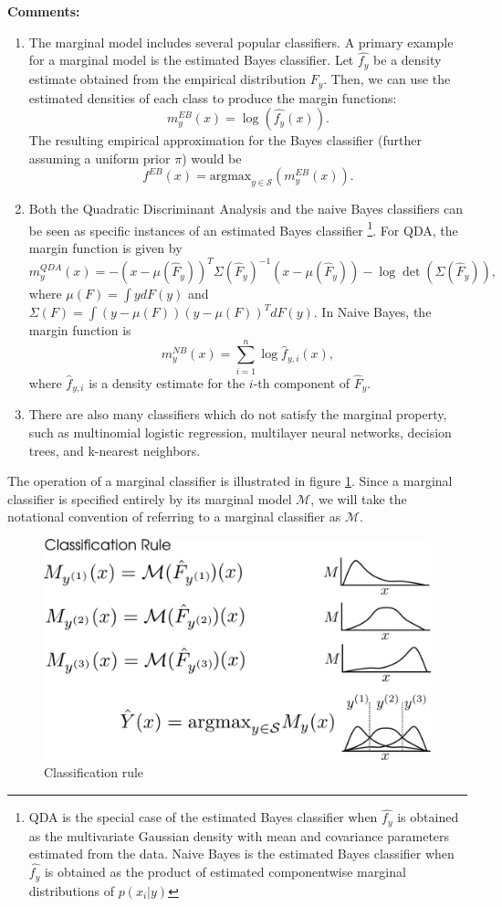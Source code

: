 \textbf{Comments:}
\begin{enumerate}
\item The marginal model includes several popular classifiers.
A primary example for a marginal model is the estimated Bayes
classifier. Let $\hat{f_y}$ be a density estimate obtained from the
empirical distribution $\hat{F_y}$. Then, we can use the estimated
densities of each class to produce the margin functions:
\[ m^{EB}_y(x) = \log(\hat{f_{y}}(x)).\]
The resulting empirical approximation for the Bayes classifier
(further assuming a uniform prior $\pi$) would be
\[ f^{EB}(x) = \text{argmax}_{y \in \mathcal{S}}(m^{EB}_y(x)).\]
\item Both the Quadratic Discriminant Analysis and the naive Bayes classifiers can be seen as specific instances of an estimated Bayes classifier
\footnote{QDA is the special case of the estimated Bayes classifier when $\hat{f_y}$ is obtained as
the multivariate Gaussian density with mean and covariance parameters estimated from the data.
Naive Bayes is the estimated Bayes classifier when $\hat{f_y}$ is obtained as the product of estimated componentwise marginal distributions
of $p(x_i|y)$}. 
For QDA, the margin function is
given by
\[
m_y^{QDA}(x) = -(x - \mu(\hat{F}_y))^T \Sigma(\hat{F}_y)^{-1} (x-\mu(\hat{F}_y)) - \log\det(\Sigma(\hat{F}_y)),
\]
where $\mu(F) = \int y dF(y)$ and $\Sigma(F) = \int (y-\mu(F))(y-\mu(F))^T dF(y)$.
In Naive Bayes, the margin function is
\[
m^{NB}_y(x) = \sum_{i=1}^n \log \hat{f}_{y, i}(x),
\]
where $\hat{f}_{y, i}$ is a density estimate for the $i$-th component of
$\hat{F}_y$.
\item There are also many classifiers which do not satisfy the marginal property, such as multinomial logistic regression,
multilayer neural networks, decision trees, and k-nearest neighbors.
\end{enumerate}

The operation of a marginal classifier is illustrated in figure
\ref{fig:classification_rule}.  Since a marginal classifier is
specified entirely by its marginal model $\mathcal{M}$, we will take
the notational convention of referring to a marginal classifier as
$\mathcal{M}$.

\begin{figure}[h]
\centering
\includegraphics[scale = 0.4]{../extrapolation_figures/classification_rule.png}
\caption{Classification rule}\label{fig:classification_rule}
\end{figure}

